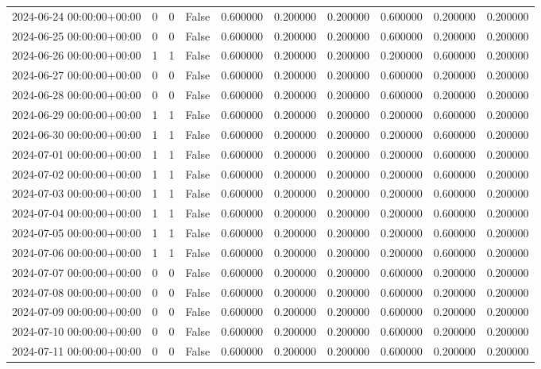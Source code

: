 \begin{tabular}{lrrrrrrrrr}
2024-06-24 00:00:00+00:00 & 0 & 0 & False & 0.600000 & 0.200000 & 0.200000 & 0.600000 & 0.200000 & 0.200000 \\
2024-06-25 00:00:00+00:00 & 0 & 0 & False & 0.600000 & 0.200000 & 0.200000 & 0.600000 & 0.200000 & 0.200000 \\
2024-06-26 00:00:00+00:00 & 1 & 1 & False & 0.600000 & 0.200000 & 0.200000 & 0.200000 & 0.600000 & 0.200000 \\
2024-06-27 00:00:00+00:00 & 0 & 0 & False & 0.600000 & 0.200000 & 0.200000 & 0.600000 & 0.200000 & 0.200000 \\
2024-06-28 00:00:00+00:00 & 0 & 0 & False & 0.600000 & 0.200000 & 0.200000 & 0.600000 & 0.200000 & 0.200000 \\
2024-06-29 00:00:00+00:00 & 1 & 1 & False & 0.600000 & 0.200000 & 0.200000 & 0.200000 & 0.600000 & 0.200000 \\
2024-06-30 00:00:00+00:00 & 1 & 1 & False & 0.600000 & 0.200000 & 0.200000 & 0.200000 & 0.600000 & 0.200000 \\
2024-07-01 00:00:00+00:00 & 1 & 1 & False & 0.600000 & 0.200000 & 0.200000 & 0.200000 & 0.600000 & 0.200000 \\
2024-07-02 00:00:00+00:00 & 1 & 1 & False & 0.600000 & 0.200000 & 0.200000 & 0.200000 & 0.600000 & 0.200000 \\
2024-07-03 00:00:00+00:00 & 1 & 1 & False & 0.600000 & 0.200000 & 0.200000 & 0.200000 & 0.600000 & 0.200000 \\
2024-07-04 00:00:00+00:00 & 1 & 1 & False & 0.600000 & 0.200000 & 0.200000 & 0.200000 & 0.600000 & 0.200000 \\
2024-07-05 00:00:00+00:00 & 1 & 1 & False & 0.600000 & 0.200000 & 0.200000 & 0.200000 & 0.600000 & 0.200000 \\
2024-07-06 00:00:00+00:00 & 1 & 1 & False & 0.600000 & 0.200000 & 0.200000 & 0.200000 & 0.600000 & 0.200000 \\
2024-07-07 00:00:00+00:00 & 0 & 0 & False & 0.600000 & 0.200000 & 0.200000 & 0.600000 & 0.200000 & 0.200000 \\
2024-07-08 00:00:00+00:00 & 0 & 0 & False & 0.600000 & 0.200000 & 0.200000 & 0.600000 & 0.200000 & 0.200000 \\
2024-07-09 00:00:00+00:00 & 0 & 0 & False & 0.600000 & 0.200000 & 0.200000 & 0.600000 & 0.200000 & 0.200000 \\
2024-07-10 00:00:00+00:00 & 0 & 0 & False & 0.600000 & 0.200000 & 0.200000 & 0.600000 & 0.200000 & 0.200000 \\
2024-07-11 00:00:00+00:00 & 0 & 0 & False & 0.600000 & 0.200000 & 0.200000 & 0.600000 & 0.200000 & 0.200000 \\

\end{tabular}
